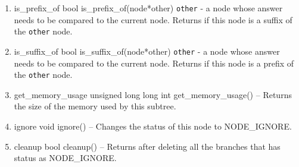 \begin{enumerate}
\begin{detail}
\end{detail}
\item \begin{detail}
{is\_prefix\_of}
{bool is\_prefix\_of(node*other)}
{\texttt{other} - a node whose answer needs to be compared to the current node.}
{Returns \true if this node is a suffix of the \texttt{other} node. } 
\end{detail}
\item \begin{detail}
{is\_suffix\_of}
{bool is\_suffix\_of(node*other)}
{\texttt{other} - a node whose answer needs to be compared to the current node.}
{Returns \true if this node is a prefix of the \texttt{other} node. } 
\end{detail}
\item \begin{detail}
{get\_memory\_usage}
{unsigned long long int get\_memory\_usage()}
{--}
{Returns the size of the memory used by this subtree. } 
\end{detail}
\item \begin{detail}
{ignore}
{void ignore()}
{--}
{Changes the status of this node to NODE\_IGNORE. } 
\end{detail}
\item \begin{detail}
{cleanup}
{bool cleanup()}
{--}
{Returns \true after deleting all the branches that has status as NODE\_IGNORE. } 
\end{detail}
\end{enumerate}

